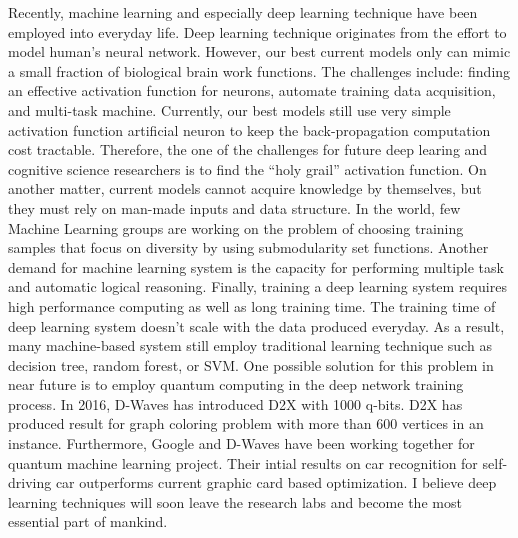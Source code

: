 \documentclass[12pt,twoside]{article}
\begin{document}
\begin{exercises}
\ifsolution \solution{}
Recently, machine learning and especially deep learning technique have been
employed into everyday life. Deep learning technique originates from the
effort to model human's neural network. However, our best current models only
can mimic a small fraction of biological brain work functions. The challenges
include: finding an effective activation function for neurons, automate training
data acquisition, and multi-task machine. Currently, our best models still use
very simple activation function artificial neuron to keep the back-propagation
computation cost tractable. Therefore, the one of the challenges for future deep 
learing and cognitive science researchers is to find the ``holy grail'' activation
function. On another matter, current models cannot acquire knowledge by themselves,
but they must rely on man-made inputs and data structure. In the world, few Machine 
Learning groups are working on the problem of choosing training samples that focus 
on diversity by using submodularity set functions. Another demand for machine 
learning system is the capacity for performing multiple task and automatic logical 
reasoning.  Finally, training a deep learning system requires high performance 
computing as well as long training time. The training time of deep learning system
doesn't scale with the data produced everyday. As a result, many machine-based system
still employ traditional learning technique such as decision tree, random forest, or
SVM. One possible solution for this problem in near future is to employ quantum 
computing in the deep network training process. In 2016, D-Waves has introduced 
D2X with 1000 q-bits. D2X has produced result for graph coloring problem with more
than 600 vertices in an instance. Furthermore, Google and D-Waves have
been working together for quantum machine learning project. Their intial results on
car recognition for self-driving car outperforms current graphic card based optimization.
I believe deep learning techniques will soon leave the research labs and become the
most essential part of mankind.
\fi


\end{exercises}
\end{document}
